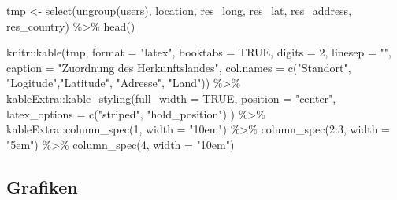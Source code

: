 \documentclass[
  11pt,
]{article}
\newenvironment{Shaded}{\begin{snugshade}}{\end{snugshade}}
\newcommand{\AttributeTok}[1]{\textcolor[rgb]{0.77,0.63,0.00}{#1}}
\newcommand{\ConstantTok}[1]{\textcolor[rgb]{0.00,0.00,0.00}{#1}}
\newcommand{\DecValTok}[1]{\textcolor[rgb]{0.00,0.00,0.81}{#1}}
\newcommand{\FunctionTok}[1]{\textcolor[rgb]{0.00,0.00,0.00}{#1}}
\newcommand{\NormalTok}[1]{#1}
\newcommand{\OtherTok}[1]{\textcolor[rgb]{0.56,0.35,0.01}{#1}}
\newcommand{\SpecialCharTok}[1]{\textcolor[rgb]{0.00,0.00,0.00}{#1}}
\newcommand{\StringTok}[1]{\textcolor[rgb]{0.31,0.60,0.02}{#1}}
\begin{document}
\begin{Shaded}
\begin{Highlighting}[]
\NormalTok{tmp }\OtherTok{\textless{}{-}} \FunctionTok{select}\NormalTok{(}\FunctionTok{ungroup}\NormalTok{(users), location, res\_long, res\_lat, res\_address, res\_country) }\SpecialCharTok{\%\textgreater{}\%} 
  \FunctionTok{head}\NormalTok{()}

\NormalTok{knitr}\SpecialCharTok{::}\FunctionTok{kable}\NormalTok{(tmp, }\AttributeTok{format =} \StringTok{"latex"}\NormalTok{, }\AttributeTok{booktabs =} \ConstantTok{TRUE}\NormalTok{, }\AttributeTok{digits =} \DecValTok{2}\NormalTok{, }\AttributeTok{linesep =} \StringTok{""}\NormalTok{,}
             \AttributeTok{caption =} \StringTok{"Zuordnung des Herkunftslandes"}\NormalTok{,}
             \AttributeTok{col.names =} \FunctionTok{c}\NormalTok{(}\StringTok{"Standort"}\NormalTok{, }\StringTok{"Logitude"}\NormalTok{,}\StringTok{"Latitude"}\NormalTok{, }\StringTok{"Adresse"}\NormalTok{, }\StringTok{"Land"}\NormalTok{)) }\SpecialCharTok{\%\textgreater{}\%}
\NormalTok{  kableExtra}\SpecialCharTok{::}\FunctionTok{kable\_styling}\NormalTok{(}\AttributeTok{full\_width =} \ConstantTok{TRUE}\NormalTok{, }
                            \AttributeTok{position =} \StringTok{"center"}\NormalTok{,}
                            \AttributeTok{latex\_options =} \FunctionTok{c}\NormalTok{(}\StringTok{"striped"}\NormalTok{, }\StringTok{"hold\_position"}\NormalTok{)}
\NormalTok{                            ) }\SpecialCharTok{\%\textgreater{}\%}
\NormalTok{  kableExtra}\SpecialCharTok{::}\FunctionTok{column\_spec}\NormalTok{(}\DecValTok{1}\NormalTok{, }\AttributeTok{width =} \StringTok{"10em"}\NormalTok{) }\SpecialCharTok{\%\textgreater{}\%}
              \FunctionTok{column\_spec}\NormalTok{(}\DecValTok{2}\SpecialCharTok{:}\DecValTok{3}\NormalTok{, }\AttributeTok{width =} \StringTok{"5em"}\NormalTok{) }\SpecialCharTok{\%\textgreater{}\%}
              \FunctionTok{column\_spec}\NormalTok{(}\DecValTok{4}\NormalTok{, }\AttributeTok{width =} \StringTok{"10em"}\NormalTok{)}
\end{Highlighting}
\end{Shaded}

\linespread{1.5}

\normalsize

\hypertarget{grafiken}{%
\subsection{Grafiken}\label{grafiken}}
\end{document}
